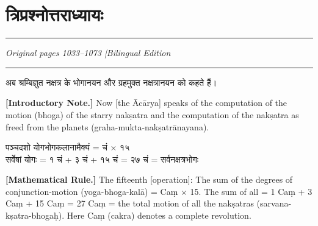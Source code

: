 \documentclass[11pt,a4paper]{article}
\newcommand{\dev}[1]{{\devanagarifont #1}}
\newcommand{\bilingualpair}[2]{%
  \noindent%
  \begin{minipage}[t]{0.48\textwidth}
    #1%
  \end{minipage}%
  \hfill%
  \begin{minipage}[t]{0.48\textwidth}
    #2%
  \end{minipage}%
  \par\vspace{0.5em}%
}
\newenvironment{sanskritcol}{\devanagarifont\small}{}
\newenvironment{englishcol}{\iastfont\small}{}
\begin{document}
\section*{\dev{त्रिप्रश्नोत्तराध्यायः}}

\noindent\rule{\textwidth}{0.6pt}
\begin{center}
\textit{Original pages 1033--1073 \quad|\quad Bilingual Edition}
\end{center}
\noindent\rule{\textwidth}{0.6pt}
\vspace{0.5cm}

\bilingualpair{%
\begin{sanskritcol}
\dev{अब श्रम्बिज्ञुत नक्षत्र के भोगानयन और ग्रहमुक्त नक्षत्रानयन को कहते हैं।}
\end{sanskritcol}%
}{%
\begin{englishcol}
\textbf{[Introductory Note.]} Now [the Ācārya] speaks of the computation of the motion (bhoga) of the starry nakṣatra and the computation of the nakṣatra as freed from the planets (graha-mukta-nakṣatrānayana).
\end{englishcol}%
}

\vspace{0.3cm}
\bilingualpair{%
\begin{sanskritcol}
\dev{पञ्चदशो योगभोगकलानामैक्यं = चं × १५}\\[0.3em]
\dev{सर्वेषां योगः = १ चं + ३ चं + १५ चं = २७ चं = सर्वनक्षत्रभोगः}
\end{sanskritcol}%
}{%
\begin{englishcol}
\textbf{[Mathematical Rule.]} The fifteenth [operation]: The sum of the degrees of conjunction-motion (yoga-bhoga-kalā) = Caṃ $\times$ 15. The sum of all = 1 Caṃ + 3 Caṃ + 15 Caṃ = 27 Caṃ = the total motion of all the nakṣatras (sarvana-\-kṣatra-bhogaḥ). Here Caṃ (cakra) denotes a complete revolution.
\end{englishcol}%
}
\end{document}
